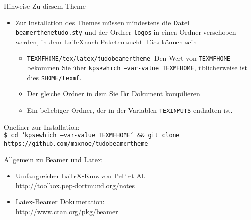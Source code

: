 \begin{frame}{Hinweise}
  Zu diesem Theme
  \begin{itemize}
    \item Zur Installation des Themes müssen mindestens die Datei \texttt{beamerthemetudo.sty} und der Ordner \texttt{logos} in einen Ordner verschoben werden, in dem \LaTeX nach Paketen sucht.
      Dies können sein
      \begin{itemize}
        \item \texttt{TEXMFHOME/tex/latex/tudobeamertheme}. Den Wert von \texttt{TEXMFHOME} bekommen Sie über \texttt{kpsewhich --var-value TEXMFHOME}, üblicherweise ist dies \texttt{\$HOME/texmf}.
        \item Der gleiche Ordner in dem Sie Ihr Dokument kompilieren.
        \item Ein beliebiger Ordner, der in der Variablen \texttt{TEXINPUTS} enthalten ist.
      \end{itemize}
  \end{itemize}
  
  Oneliner zur Installation:\\
  \texttt{\footnotesize\$ cd `kpsewhich --var-value TEXMFHOME` \&\& git clone https://github.com/maxnoe/tudobeamertheme}

  \medskip
  Allgemein zu Beamer und Latex:
  \begin{itemize}
    \item Umfangreicher \LaTeX-Kurs von PeP et Al. \\
      \url{http://toolbox.pep-dortmund.org/notes}
    \item Latex-Beamer Dokumetation:\\
    \url{http://www.ctan.org/pkg/beamer}
  \end{itemize}
\end{frame}